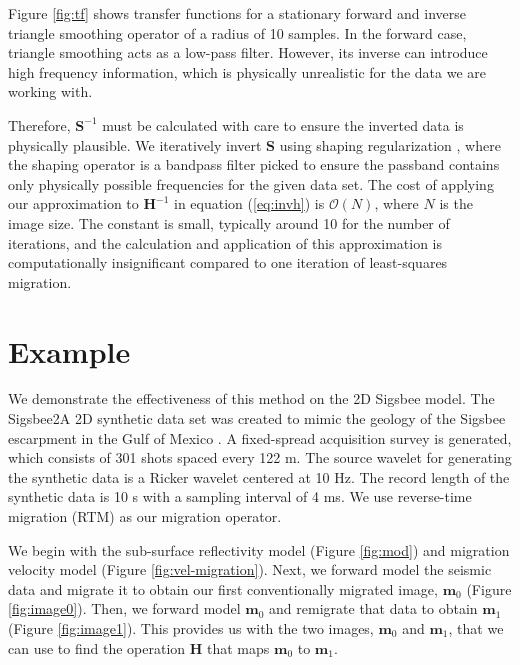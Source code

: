 
    Figure \ref{fig:tf} shows transfer functions for a stationary forward and inverse triangle smoothing operator of a radius of 10 samples.
    In the forward case, triangle smoothing acts as a low-pass filter.
    However, its inverse can introduce high frequency information, which is physically unrealistic for the data we are working with.


    Therefore, $\mathbf{S}^{-1}$ must be calculated with care to ensure the inverted data is physically plausible. 
    We iteratively invert $\mathbf{S}$ using shaping regularization \cite[]{shap}, where the shaping operator is a bandpass filter picked to ensure the passband contains only physically possible frequencies for the given data set.
    The cost of applying our approximation to $\mathbf{H}^{-1}$ in equation (\ref{eq:invh}) is $\mathcal{O}(N)$, where $N$ is the image size. 
    The constant is small, typically around 10 for the number of iterations, and the calculation and application of this approximation is computationally insignificant compared to one iteration of least-squares migration. 

\section{Example}

    We demonstrate the effectiveness of this method on the 2D Sigsbee model. 
    The Sigsbee2A 2D synthetic data set was created to mimic the geology of the Sigsbee escarpment in the Gulf of Mexico \cite[]{sigsbee}.
    A fixed-spread acquisition survey is generated, which consists of 301 shots spaced every 122 m.
    The source wavelet for generating the synthetic data is a Ricker wavelet centered at 10 Hz.
    The record length of the synthetic data is 10 s with a sampling interval of 4 ms.
We use reverse-time migration (RTM) as our migration operator.


    We begin with the sub-surface reflectivity model (Figure \ref{fig:mod}) and migration velocity model (Figure \ref{fig:vel-migration}).
    Next, we forward model the seismic data and migrate it to obtain our first conventionally migrated image, $\mathbf{m}_0$ (Figure \ref{fig:image0}). 
    Then, we forward model $\mathbf{m}_0$ and remigrate that data to obtain $\mathbf{m}_1$ (Figure \ref{fig:image1}).
    This provides us with the two images, $\mathbf{m}_0$ and $\mathbf{m}_1$, that we can use to find the operation $\mathbf{H}$ that maps $\mathbf{m}_0$ to $\mathbf{m}_1$.


